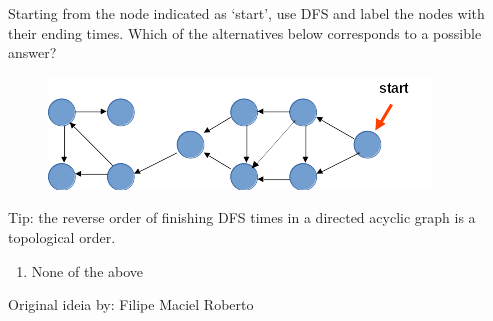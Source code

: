 
Starting from the node indicated as `start', use DFS and label the nodes with their ending times. Which of the alternatives below corresponds to a possible answer?

\begin{figure}[H]
    \centering
    \includegraphics{images/119-0.png}
\end{figure}

Tip: the reverse order of finishing DFS times in a directed acyclic graph is a topological order.

\begin{enumerate}[label={\Alph*.}]

\raggedcolumns{}

\raggedcolumns{}

    \item None of the above
\end{enumerate}

Original ideia by: Filipe Maciel Roberto
